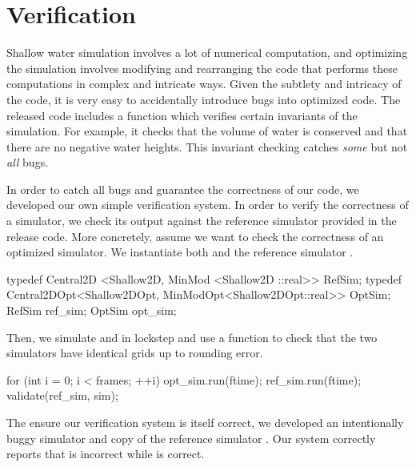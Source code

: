 \section{Verification}
Shallow water simulation involves a lot of numerical computation, and
optimizing the simulation involves modifying and rearranging the code that
performs these computations in complex and intricate ways. Given the subtlety
and intricacy of the code, it is very easy to accidentally introduce bugs into
optimized code. The released code includes a  function
which verifies certain invariants of the simulation. For example, it checks
that the volume of water is conserved and that there are no negative water
heights. This invariant checking catches \emph{some} but not \emph{all} bugs.

In order to catch all bugs and guarantee the correctness of our code, we
developed our own simple verification system. In order to verify the
correctness of a simulator, we check its output against the reference simulator
provided in the release code. More concretely, assume we want to check the
correctness of an optimized  simulator. We instantiate both
 and the reference simulator .

\begin{CPP}
typedef Central2D   <Shallow2D,    MinMod   <Shallow2D   ::real>> RefSim;
typedef Central2DOpt<Shallow2DOpt, MinModOpt<Shallow2DOpt::real>> OptSim;
RefSim ref_sim;
OptSim opt_sim;
\end{CPP}

Then, we simulate  and  in lockstep and use a
function  to check that the two simulators have identical grids
up to rounding error.

\begin{CPP}
for (int i = 0; i < frames; ++i) {
    opt_sim.run(ftime);
    ref_sim.run(ftime);
    validate(ref_sim, sim);
}
\end{CPP}

The ensure our verification system is itself correct, we developed an
intentionally buggy  simulator and copy of the reference
simulator . Our system correctly reports that  is
incorrect while  is correct.
